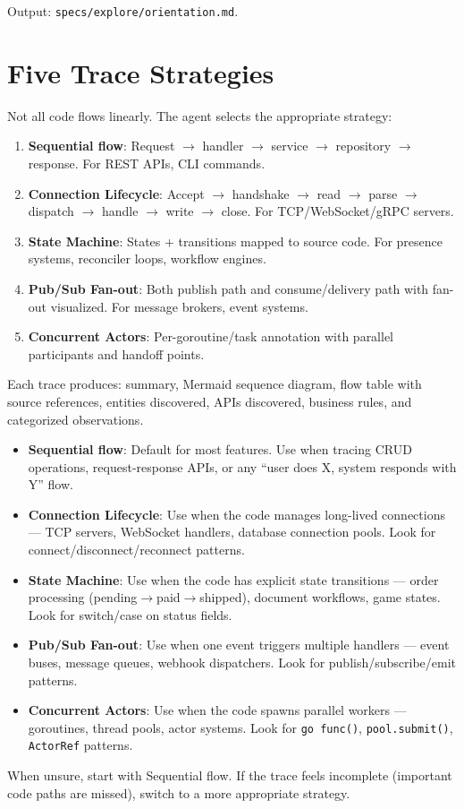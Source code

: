 \documentclass[11pt,a4paper,openright,twoside]{report}
\newcommand{\file}[1]{\texttt{#1}}
\begin{document}
Output: \file{specs/explore/orientation.md}.

\section{Five Trace Strategies}

Not all code flows linearly. The agent selects the appropriate strategy:

\begin{enumerate}
  \item \textbf{Sequential flow}: Request $\rightarrow$ handler $\rightarrow$ service $\rightarrow$ repository $\rightarrow$ response. For REST APIs, CLI commands.
  \item \textbf{Connection Lifecycle}: Accept $\rightarrow$ handshake $\rightarrow$ read $\rightarrow$ parse $\rightarrow$ dispatch $\rightarrow$ handle $\rightarrow$ write $\rightarrow$ close. For TCP/WebSocket/gRPC servers.
  \item \textbf{State Machine}: States + transitions mapped to source code. For presence systems, reconciler loops, workflow engines.
  \item \textbf{Pub/Sub Fan-out}: Both publish path and consume/delivery path with fan-out visualized. For message brokers, event systems.
  \item \textbf{Concurrent Actors}: Per-goroutine/task annotation with parallel participants and handoff points.
\end{enumerate}

Each trace produces: summary, Mermaid sequence diagram, flow table with source references, entities discovered, APIs discovered, business rules, and categorized observations.

\begin{tipbox}
\begin{itemize}[nosep]
\item \textbf{Sequential flow}: Default for most features. Use when tracing CRUD operations, request-response APIs, or any ``user does X, system responds with Y'' flow.
\item \textbf{Connection Lifecycle}: Use when the code manages long-lived connections --- TCP servers, WebSocket handlers, database connection pools. Look for connect/disconnect/reconnect patterns.
\item \textbf{State Machine}: Use when the code has explicit state transitions --- order processing (pending$\rightarrow$paid$\rightarrow$shipped), document workflows, game states. Look for switch/case on status fields.
\item \textbf{Pub/Sub Fan-out}: Use when one event triggers multiple handlers --- event buses, message queues, webhook dispatchers. Look for publish/subscribe/emit patterns.
\item \textbf{Concurrent Actors}: Use when the code spawns parallel workers --- goroutines, thread pools, actor systems. Look for \texttt{go func()}, \texttt{pool.submit()}, \texttt{ActorRef} patterns.
\end{itemize}
When unsure, start with Sequential flow. If the trace feels incomplete (important code paths are missed), switch to a more appropriate strategy.
\end{tipbox}
\end{document}
